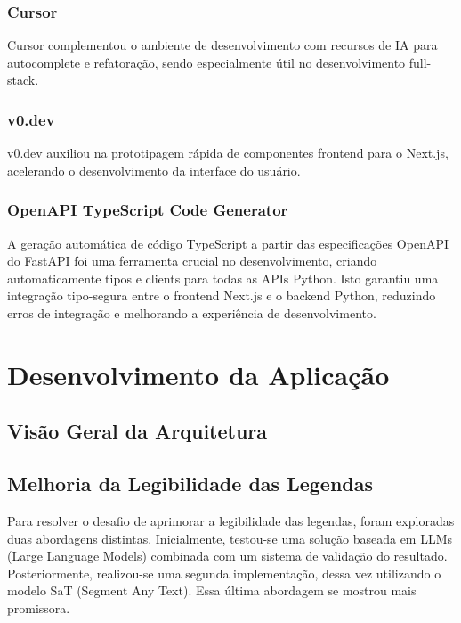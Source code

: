 \documentclass[tcc,capa]{texufpel}
\begin{document}
\subsection{Cursor}
Cursor complementou o ambiente de desenvolvimento com recursos de IA para autocomplete e refatoração, sendo especialmente útil no desenvolvimento full-stack.

\subsection{v0.dev}
v0.dev auxiliou na prototipagem rápida de componentes frontend para o Next.js, acelerando o desenvolvimento da interface do usuário.

\subsection{OpenAPI TypeScript Code Generator}
A geração automática de código TypeScript a partir das especificações OpenAPI do FastAPI foi uma ferramenta crucial no desenvolvimento, criando automaticamente tipos e clients para todas as APIs Python. Isto garantiu uma integração tipo-segura entre o frontend Next.js e o backend Python, reduzindo erros de integração e melhorando a experiência de desenvolvimento.















\chapter{Desenvolvimento da Aplicação}

\section{Visão Geral da Arquitetura}

\section{Melhoria da Legibilidade das Legendas}

Para resolver o desafio de aprimorar a legibilidade das legendas, foram exploradas duas abordagens distintas. Inicialmente, testou-se uma solução baseada em LLMs (Large Language Models) combinada com um sistema de validação do resultado. Posteriormente, realizou-se uma segunda implementação, dessa vez utilizando o modelo SaT (Segment Any Text). Essa última abordagem se mostrou mais promissora.
\end{document}
